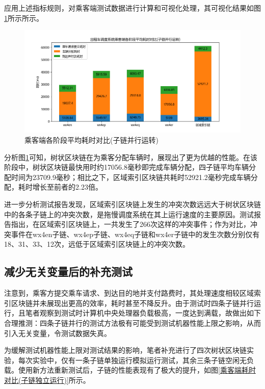 应用上述指标规则，对乘客端测试数据进行计算和可视化处理，其可视化结果如图\ref{乘客端耗时对比(子链并行运行)}所示所示。

\begin{figure}[htbp]
    \centering
    \includegraphics[width=\textwidth]{images/乘客端测试-并行.png}
    \caption{乘客端各阶段平均耗时对比(子链并行运转)}\label{乘客端耗时对比(子链并行运行)} %
\end{figure}

分析图\ref{乘客端耗时对比(子链并行运行)}可知，树状区块链在为乘客分配车辆时，展现出了更为优越的性能。在该阶段中，树状区块链最快用时约17056.8毫秒即完成车辆分配，四子链平均车辆分配时间为23709.9毫秒；相比之下，区域索引区块链共耗时52921.2毫秒完成车辆分配，耗时增长至前者的2.23倍。

进一步分析测试报告发现，区域索引区块链上发生的冲突次数远远大于树状区块链中的各条子链上的冲突次数，是拖慢调度系统在其上运行速度的主要原因。测试报告指出，在区域索引区块链上，一共发生了266次这样的冲突事件；作为对比，冲突事件在wx4en子链、wx4ep子链、wx4eq子链和wx4er子链中的发生次数分别仅有18、31、33、12次，远低于区域索引区块链上的冲突次数。

\subsection{减少无关变量后的补充测试}

注意到，乘客方提交乘车请求、到达目的地并支付路费时，其处理速度相较区域索引区块链并未展现出更高的效率，耗时甚至不降反升。由于测试时四条子链并行运行，且笔者观察到测试时计算机中央处理器负载极高，一度达到满载，故做出如下合理推测：四条子链并行的测试方法极有可能受到测试机器性能上限之影响，从而引入无关变量，令测试数据失真。

为缓解测试机器性能上限对测试结果的影响，笔者补充进行了四次树状区块链实验，每次实验中，仅有一条子链单独运行模拟运行测试，其余三条子链空闲无负载。使用新方法重新测试后，子链的性能表现有了极大的提升，如图\ref{乘客端耗时对比(子链独立运行)}所示。

